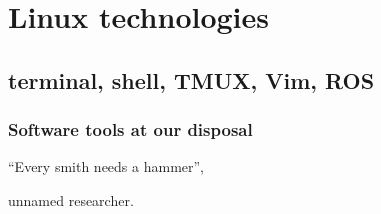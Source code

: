 \documentclass[aspectratio=1610]{beamer}
\begin{document}
\begin{frame}
\begin{figure}


  \end{figure}

\end{frame}


\section{Linux technologies}
\subsection{terminal, shell, TMUX, Vim, ROS}

\begin{frame}
  \frametitle{Software tools at our disposal}

  \begin{center}
    ``Every smith needs a hammer'',
  \end{center}

  \begin{flushright}
    unnamed researcher.
  \end{flushright}

\end{frame}

\end{document}
